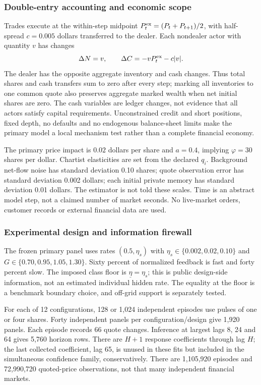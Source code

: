 \documentclass[10pt,twocolumn,letterpaper]{article}
\theoremstyle{definition}
\theoremstyle{remark}
\begin{document}
\subsubsection{Double-entry accounting and economic scope}
Trades execute at the within-step midpoint $P_t^{\rm ex}=(P_t+P_{t+1})/2$, with half-spread $c=0.005$ dollars transferred to the dealer. Each nondealer actor with quantity $v$ has changes
\[
 \Delta N=v,\qquad \Delta C=-vP_t^{\rm ex}-c|v|.
\]
The dealer has the opposite aggregate inventory and cash changes. Thus total shares and cash transfers sum to zero after every step; marking all inventories to one common quote also preserves aggregate marked wealth when net initial shares are zero. The cash variables are ledger changes, not evidence that all actors satisfy capital requirements. Unconstrained credit and short positions, fixed depth, no defaults and no endogenous balance-sheet limits make the primary model a local mechanism test rather than a complete financial economy.

The primary price impact is $0.02$ dollars per share and $a=0.4$, implying $\varphi=30$ shares per dollar. Chartist elasticities are set from the declared $q_i$. Background net-flow noise has standard deviation 0.10 shares; quote observation error has standard deviation 0.002 dollars; each initial private memory has standard deviation 0.01 dollars. The estimator is not told these scales. Time is an abstract model step, not a claimed number of market seconds. No live-market orders, customer records or external financial data are used.

\subsubsection{Experimental design and information firewall}
The frozen primary panel uses rates $(0.5,\eta_s)$ with $\eta_s\in\{0.002,0.02,0.10\}$ and $G\in\{0.70,0.95,1.05,1.30\}$. Sixty percent of normalized feedback is fast and forty percent slow. The imposed class floor is $\underline\eta=\eta_s$; this is public design-side information, not an estimated individual hidden rate. The equality at the floor is a benchmark boundary choice, and off-grid support is separately tested.

For each of 12 configurations, 128 or 1,024 independent episodes use pulses of one or four shares. Forty independent panels per configuration/design give 1,920 panels. Each episode records 66 quote changes. Inference at largest lags 8, 24 and 64 gives 5,760 horizon rows. There are $H+1$ response coefficients through lag $H$; the last collected coefficient, lag 65, is unused in these fits but included in the simultaneous confidence family, conservatively. There are 1,105,920 episodes and 72,990,720 quoted-price observations, not that many independent financial markets.
\end{document}
